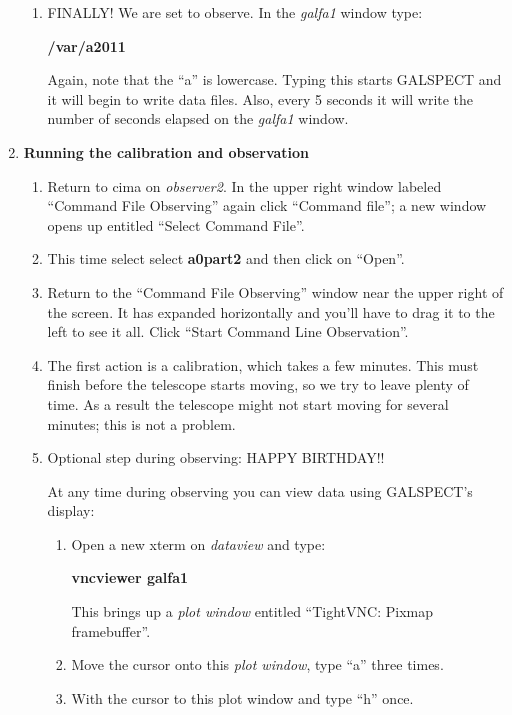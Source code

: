 \begin{enumerate}
\begin{enumerate}
\item FINALLY! We are set to observe. In the {\it galfa1} window type:

{\bf /var/a2011}

Again, note that the ``a'' is lowercase. Typing this starts GALSPECT and
it will begin to write data files. Also, every 5 seconds it will write
the number of seconds elapsed on the {\it galfa1} window.

\end{enumerate}
\item {\bf Running the calibration and observation} \begin{enumerate}

\item Return to cima on {\it observer2}.  In the upper right window
labeled ``Command File Observing'' again click ``Command file''; a new
window opens up entitled ``Select Command File''. 

\item This time select select {\bf a0part2} and then click on
``Open''. 

\item Return to the ``Command File Observing'' window near the upper
right of the screen. It has expanded horizontally and you'll have to
drag it to the left to see it all. Click ``Start Command Line Observation''.

\item The first action is a calibration, which takes a few minutes. This
must finish before the telescope starts moving, so we try to leave
plenty of time.  As a result the telescope might not start moving for
several minutes; this is not a problem. 

\item {Optional step during observing: HAPPY BIRTHDAY!!} 

	At any time during observing you can view data using GALSPECT's
display: \begin{enumerate}

\item Open a new xterm on {\it dataview} and type:

{\bf vncviewer galfa1} 

This brings up a {\it plot window} entitled ``TightVNC: Pixmap framebuffer''.

\item Move the cursor onto this {\it plot window}, type ``a'' three times.

\item With the cursor to this plot window and type ``h'' once.


\end{enumerate}
\end{enumerate}
\end{enumerate}
